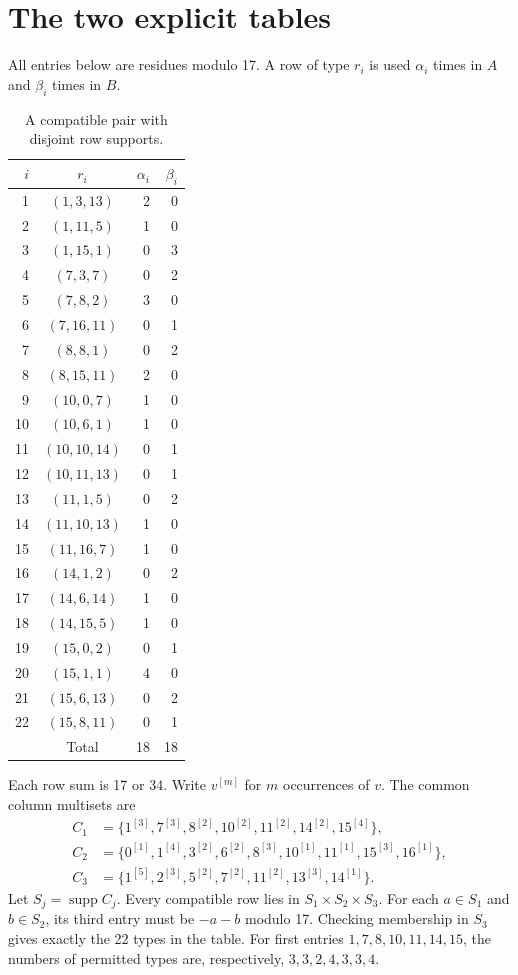 \documentclass[11pt,a4paper]{article}
\newcommand{\supp}{\operatorname{supp}}
\begin{document}
\clearpage
\section{The two explicit tables}
All entries below are residues modulo 17. A row of type $r_i$ is used
$\alpha_i$ times in $A$ and $\beta_i$ times in $B$.
\begin{table}[H]
\centering
\renewcommand{\arraystretch}{1.06}
\begin{tabular}{rcrr}
\toprule
$i$ & $r_i$ & $\alpha_i$ & $\beta_i$\\
\midrule
1 & $(1,3,13)$ & 2 & 0\\
2 & $(1,11,5)$ & 1 & 0\\
3 & $(1,15,1)$ & 0 & 3\\
4 & $(7,3,7)$ & 0 & 2\\
5 & $(7,8,2)$ & 3 & 0\\
6 & $(7,16,11)$ & 0 & 1\\
7 & $(8,8,1)$ & 0 & 2\\
8 & $(8,15,11)$ & 2 & 0\\
9 & $(10,0,7)$ & 1 & 0\\
10 & $(10,6,1)$ & 1 & 0\\
11 & $(10,10,14)$ & 0 & 1\\
12 & $(10,11,13)$ & 0 & 1\\
13 & $(11,1,5)$ & 0 & 2\\
14 & $(11,10,13)$ & 1 & 0\\
15 & $(11,16,7)$ & 1 & 0\\
16 & $(14,1,2)$ & 0 & 2\\
17 & $(14,6,14)$ & 1 & 0\\
18 & $(14,15,5)$ & 1 & 0\\
19 & $(15,0,2)$ & 0 & 1\\
20 & $(15,1,1)$ & 4 & 0\\
21 & $(15,6,13)$ & 0 & 2\\
22 & $(15,8,11)$ & 0 & 1\\
\midrule
 & Total & 18 & 18\\
\bottomrule
\end{tabular}
\caption{A compatible pair with disjoint row supports.}\label{tab:data}
\end{table}
Each row sum is 17 or 34. Write $v^{[m]}$ for $m$ occurrences of $v$.
The common column multisets are
\begin{align*}
 C_1&=\{1^{[3]},7^{[3]},8^{[2]},10^{[2]},11^{[2]},14^{[2]},15^{[4]}\},\\
 C_2&=\{0^{[1]},1^{[4]},3^{[2]},6^{[2]},8^{[3]},10^{[1]},11^{[1]},15^{[3]},16^{[1]}\},\\
 C_3&=\{1^{[5]},2^{[3]},5^{[2]},7^{[2]},11^{[2]},13^{[3]},14^{[1]}\}.
\end{align*}
Let $S_j=\supp C_j$. Every compatible row lies in $S_1\times S_2\times S_3$.
For each $a\in S_1$ and $b\in S_2$, its third entry must be $-a-b$ modulo 17.
Checking membership in $S_3$ gives exactly the 22 types in the table.
For first entries $1,7,8,10,11,14,15$, the numbers of permitted types are,
respectively, $3,3,2,4,3,3,4$.
\end{document}
